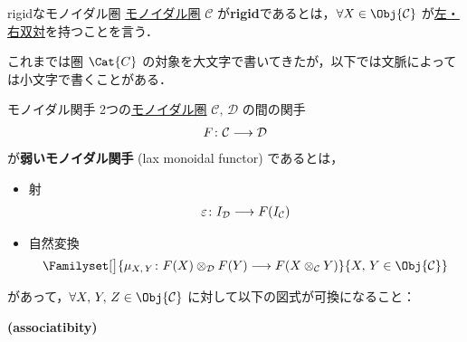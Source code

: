\documentclass[TQFT_main]{subfiles}
\begin{document}
\begin{mydef}[label=redef:rigid]{rigidなモノイダル圏}
    \hyperref[def:monoidal-category]{モノイダル圏} $\mathcal{C}$ が\textbf{rigid}であるとは，$\forall X \in \Obj{\mathcal{C}}$ が\hyperref[redef:dual]{左・右双対}を持つことを言う．
\end{mydef}

\begin{marker}
    これまでは圏 $\Cat{C}$ の対象を大文字で書いてきたが，以下では文脈によっては小文字で書くことがある．
\end{marker}

\begin{mydef}[label=redef:monidal-functor,breakable]{モノイダル関手}
    2つの\hyperref[def:monoidal-category]{モノイダル圏} $\mathcal{C},\, \mathcal{D}$ の間の関手
    \begin{align}
        F \colon \mathcal{C} \longrightarrow \mathcal{D}
    \end{align}
    が\textbf{弱いモノイダル関手} (lax monoidal functor) であるとは，
    \begin{itemize}
        \item 射
        \begin{align}
            \varepsilon \colon I_{\mathcal{D}} \longrightarrow F(I_{\mathcal{C}})
        \end{align}
        
        \item 自然変換
        \begin{align}
            \Familyset[\big]{\mu_{X,\, Y} \colon F(X) \otimes_{\mathcal{D}} F(Y) \lto F(X \otimes_{\mathcal{C}} Y)}{X,\, Y \in \Obj{\mathcal{C}}}
        \end{align}
    \end{itemize}
    があって，$\forall X,\, Y,\, Z \in \Obj{\mathcal{C}}$ に対して以下の図式が可換になること：
    \begin{description}
        \item[\textbf{(associatibity)}]　
        
        \begin{center}
        \end{center}
        

\end{description}
\end{mydef}
\end{document}
